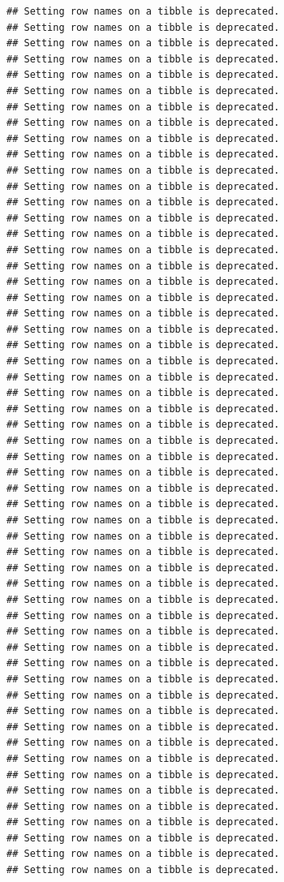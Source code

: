 \documentclass[
]{article}
\begin{document}
\begin{verbatim}
## Setting row names on a tibble is deprecated.
## Setting row names on a tibble is deprecated.
## Setting row names on a tibble is deprecated.
## Setting row names on a tibble is deprecated.
## Setting row names on a tibble is deprecated.
## Setting row names on a tibble is deprecated.
## Setting row names on a tibble is deprecated.
## Setting row names on a tibble is deprecated.
## Setting row names on a tibble is deprecated.
## Setting row names on a tibble is deprecated.
## Setting row names on a tibble is deprecated.
## Setting row names on a tibble is deprecated.
## Setting row names on a tibble is deprecated.
## Setting row names on a tibble is deprecated.
## Setting row names on a tibble is deprecated.
## Setting row names on a tibble is deprecated.
## Setting row names on a tibble is deprecated.
## Setting row names on a tibble is deprecated.
## Setting row names on a tibble is deprecated.
## Setting row names on a tibble is deprecated.
## Setting row names on a tibble is deprecated.
## Setting row names on a tibble is deprecated.
## Setting row names on a tibble is deprecated.
## Setting row names on a tibble is deprecated.
## Setting row names on a tibble is deprecated.
## Setting row names on a tibble is deprecated.
## Setting row names on a tibble is deprecated.
## Setting row names on a tibble is deprecated.
## Setting row names on a tibble is deprecated.
## Setting row names on a tibble is deprecated.
## Setting row names on a tibble is deprecated.
## Setting row names on a tibble is deprecated.
## Setting row names on a tibble is deprecated.
## Setting row names on a tibble is deprecated.
## Setting row names on a tibble is deprecated.
## Setting row names on a tibble is deprecated.
## Setting row names on a tibble is deprecated.
## Setting row names on a tibble is deprecated.
## Setting row names on a tibble is deprecated.
## Setting row names on a tibble is deprecated.
## Setting row names on a tibble is deprecated.
## Setting row names on a tibble is deprecated.
## Setting row names on a tibble is deprecated.
## Setting row names on a tibble is deprecated.
## Setting row names on a tibble is deprecated.
## Setting row names on a tibble is deprecated.
## Setting row names on a tibble is deprecated.
## Setting row names on a tibble is deprecated.
## Setting row names on a tibble is deprecated.
## Setting row names on a tibble is deprecated.
## Setting row names on a tibble is deprecated.
## Setting row names on a tibble is deprecated.
## Setting row names on a tibble is deprecated.
## Setting row names on a tibble is deprecated.
## Setting row names on a tibble is deprecated.

\end{verbatim}
\end{document}
